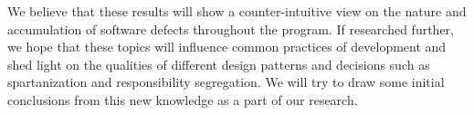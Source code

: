 We believe that these results will show a counter-intuitive view on the nature and accumulation of software defects throughout the program.
If researched further, we hope that these topics will influence common practices of development and shed light on the qualities
of different design patterns and decisions such as spartanization and responsibility segregation. We will try to draw some initial conclusions
from this new knowledge as a part of our research.
